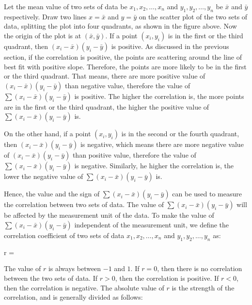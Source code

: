 \documentclass{report}
\begin{document}
\begin{multicols}{2}
  Let the mean value of two sets of data be $x_1, x_2, \dots, x_n$ and $y_1, y_2,
    \dots, y_n$ be $\bar{x}$ and $\bar{y}$ respectively. Draw two lines $x =
    \bar{x}$ and $y = \bar{y}$ on the scatter plot of the two sets of data,
  splitting the plot into four quadrants, as shown in the figure above. Now the
  origin of the plot is at $(\bar{x}, \bar{y})$. If a point $(x_i, y_i)$ is in
  the first or the third quadrant, then $(x_i - \bar{x})(y_i - \bar{y})$ is
  positive. As discussed in the previous section, if the correlation is positive,
  the points are scattering around the line of best fit with positive slope.
  Therefore, the points are more likely to be in the first or the third quadrant.
  That means, there are more positive value of $(x_i - \bar{x})(y_i - \bar{y})$
  than negative value, therefore the value of $\sum{(x_i - \bar{x})(y_i -
      \bar{y})}$ is positive. The higher the correlation is, the more points are in
  the first or the third quadrant, the higher the positive value of $\sum{(x_i -
      \bar{x})(y_i - \bar{y})}$ is.

  On the other hand, if a point $(x_i, y_i)$ is in the second or the fourth
  quadrant, then $(x_i - \bar{x})(y_i - \bar{y})$ is negative, which means there
  are more negative value of $(x_i - \bar{x})(y_i - \bar{y})$ than positive
  value, therefore the value of $\sum{(x_i - \bar{x})(y_i - \bar{y})}$ is
  negative. Similarly, he higher the correlation is, the lower the negative value
  of $\sum{(x_i - \bar{x})(y_i - \bar{y})}$ is.

  Hence, the value and the sign of $\sum{(x_i - \bar{x})(y_i - \bar{y})}$ can be
  used to measure the correlation between two sets of data. The value of
  $\sum{(x_i - \bar{x})(y_i - \bar{y})}$ will be affected by the measurement unit
  of the data. To make the value of $\sum{(x_i - \bar{x})(y_i - \bar{y})}$
  independent of the measurement unit, we define the correlation coefficient of
  two sets of data $x_1, x_2, \dots, x_n$ and $y_1, y_2, \dots, y_n$ as:

  \begin{cequation}
    r = 
  \end{cequation}

  The value of $r$ is always between $-1$ and $1$. If $r = 0$, then there is no
  correlation between the two sets of data. If $r > 0$, then the correlation is
  positive. If $r < 0$, then the correlation is negative. The absolute value of
  $r$ is the strength of the correlation, and is generally divided as follows:


\end{multicols}
\end{document}
